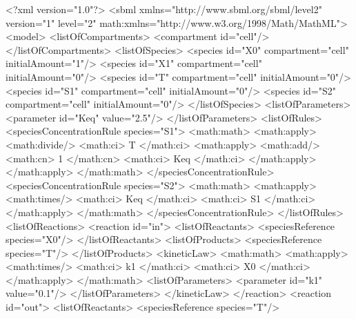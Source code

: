 \documentclass[10pt]{cekarticle}
\begin{document}
\begin{example}
<?xml version="1.0"?>
<sbml xmlns="http://www.sbml.org/sbml/level2" version="1" level="2"
      math:xmlns="http://www.w3.org/1998/Math/MathML">
    <model>
        <listOfCompartments>
            <compartment id="cell"/>
        </listOfCompartments>
        <listOfSpecies>
            <species id="X0" compartment="cell" initialAmount="1"/>
            <species id="X1" compartment="cell" initialAmount="0"/>
            <species id="T" compartment="cell" initialAmount="0"/>
            <species id="S1" compartment="cell" initialAmount="0"/>
            <species id="S2" compartment="cell" initialAmount="0"/>
        </listOfSpecies>
        <listOfParameters>
            <parameter id="Keq" value="2.5"/>
        </listOfParameters>
        <listOfRules>
            <speciesConcentrationRule species="S1">
                <math:math>
                    <math:apply>
                        <math:divide/>
                        <math:ci> T </math:ci>
                        <math:apply>
                            <math:add/>
                            <math:cn> 1 </math:cn>
                            <math:ci> Keq </math:ci>
                        </math:apply>
                    </math:apply>
                </math:math>
            </speciesConcentrationRule>
            <speciesConcentrationRule species="S2">
                <math:math>
                    <math:apply>
                        <math:times/>
                        <math:ci> Keq </math:ci>
                        <math:ci> S1 </math:ci>
                    </math:apply>
                </math:math>
            </speciesConcentrationRule>
        </listOfRules>
        <listOfReactions>
            <reaction id="in">
                <listOfReactants>
                    <speciesReference species="X0"/>
                </listOfReactants>
                <listOfProducts>
                    <speciesReference species="T"/>
                </listOfProducts>
                <kineticLaw>
                    <math:math>
                        <math:apply>
                            <math:times/>
                            <math:ci> k1 </math:ci>
                            <math:ci> X0 </math:ci>
                        </math:apply>
                    </math:math>
                    <listOfParameters>
                        <parameter id="k1" value="0.1"/>
                    </listOfParameters>
                </kineticLaw>
            </reaction>
            <reaction id="out">
                <listOfReactants>
                    <speciesReference species="T"/>

\end{example}
\end{document}
